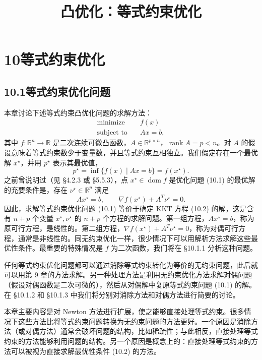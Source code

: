 \documentclass[UTF8,12pt,a4paper,fontset=fandol]{ctexart}
\title{凸优化：等式约束优化}
\author{}
\date{}
\begin{document}
\maketitle

\section*{10\quad 等式约束优化}

\subsection*{10.1\quad 等式约束优化问题}

本章讨论下述等式约束凸优化问题的求解方法：
\begin{equation}
\begin{aligned}
\text{minimize}\quad & f(x)\\
\text{subject to}\quad & Ax=b,
\end{aligned}
\tag{10.1}
\end{equation}
其中 $f:\mathbb{R}^n\to\mathbb{R}$ 是二次连续可微凸函数，$A\in\mathbb{R}^{p\times n}$，$\operatorname{rank}A=p<n$。对 $A$ 的假设意味着等式约束数少于变量数，并且等式约束互相独立。我们假定存在一个最优解 $x^\star$，并用 $p^\star$ 表示其最优值，
\[
p^\star=\inf\{f(x)\mid Ax=b\}=f(x^\star).
\]
之前曾说明过（见 \S4.2.3 或 \S5.5.3），点 $x^\star\in\operatorname{dom} f$ 是优化问题 (10.1) 的最优解的充要条件是，存在 $\nu^\star\in\mathbb{R}^p$ 满足
\begin{equation}
Ax^\star=b,\qquad \nabla f(x^\star)+A^T\nu^\star=0.
\tag{10.2}
\end{equation}
因此，求解等式约束优化问题 (10.1) 等价于确定 KKT 方程 (10.2) 的解，这是含有 $n+p$ 个变量 $x^\star,\nu^\star$ 的 $n+p$ 个方程的求解问题。第一组方程，$Ax^\star=b$，称为原可行方程，是线性的。第二组方程，$\nabla f(x^\star)+A^T\nu^\star=0$，称为对偶可行方程，通常是非线性的。同无约束优化一样，很少情况下可以用解析方法求解这些最优性条件。最重要的特殊情况是 $f$ 为二次函数，我们将在 \S10.1.1 分析这种问题。

任何等式约束优化问题都可以通过消除等式约束转化为等价的无约束问题，此后就可以用第 9 章的方法求解。另一种处理方法是利用无约束优化方法求解对偶问题（假设对偶函数是二次可微的），然后从对偶解中复原等式约束问题 (10.1) 的解。在 \S10.1.2 和 \S10.1.3 中我们将分别对消除方法和对偶方法进行简要的讨论。

本章主要内容是对 Newton 方法进行扩展，使之能够直接处理等式约束。很多情况下这些方法比将等式约束问题转换为无约束问题的方法更好。一个原因是消除方法（或对偶方法）通常会破坏问题的结构，比如稀疏性；与此相反，直接处理等式约束的方法能够利用问题的结构。另一个原因是概念上的：直接处理等式约束的方法可以被视为直接求解最优性条件 (10.2) 的方法。
\end{document}

